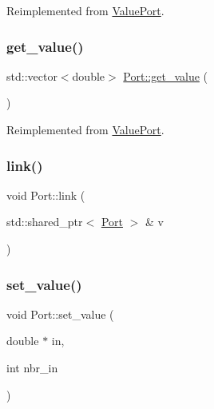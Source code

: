 Reimplemented from \hyperlink{class_value_port_aea5af6fc415d13f868e5d676d1d9402e}{Value\+Port}.

\mbox{\label{class_port_a82509b87aa9d775d0a40e2b446f2b7ad}} 
\subsubsection{\texorpdfstring{get\+\_\+value()}{get\_value()}\hspace{0.1cm}{\footnotesize\ttfamily [2/2]}}
{\footnotesize\ttfamily std\+::vector$<$double$>$ \hyperlink{class_port_1_1get__value}{Port\+::get\+\_\+value} (\begin{DoxyParamCaption}{ }\end{DoxyParamCaption})\hspace{0.3cm}{\ttfamily [virtual]}}



Reimplemented from \hyperlink{class_value_port_a12f11f190a32156f9afbcf38d9da0d2d}{Value\+Port}.

\mbox{\label{class_port_aec33d8bfca05139b1e319f15d2b3a1b8}} 
\subsubsection{\texorpdfstring{link()}{link()}}
{\footnotesize\ttfamily void Port\+::link (\begin{DoxyParamCaption}\item[{std\+::shared\+\_\+ptr$<$ \hyperlink{class_port}{Port} $>$ \&}]{v }\end{DoxyParamCaption})\hspace{0.3cm}{\ttfamily [inline]}}

\mbox{\label{class_port_a18b368a7d48acb802b6671693f54adcb}} 
\subsubsection{\texorpdfstring{set\+\_\+value()}{set\_value()}\hspace{0.1cm}{\footnotesize\ttfamily [1/2]}}
{\footnotesize\ttfamily void Port\+::set\+\_\+value (\begin{DoxyParamCaption}\item[{double $\ast$}]{in,  }\item[{int}]{nbr\+\_\+in }\end{DoxyParamCaption})\hspace{0.3cm}{\ttfamily [virtual]}}



